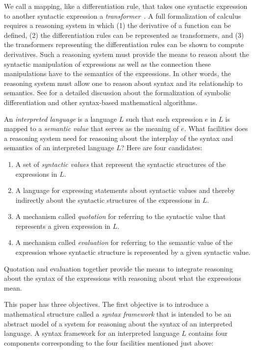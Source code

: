 \documentclass[11pt,fleqn]{article}
\newcommand{\be}{\begin{enumerate}}
\newcommand{\ee}{\end{enumerate}}
\newcommand{\bsp}{\begin{sloppypar}}
\newcommand{\esp}{\end{sloppypar}}
\begin{document}
We call a mapping, like a differentiation rule, that takes one
syntactic expression to another syntactic expression a
\emph{transformer}~\cite{FarmerMohrenschildt03}.  A full formalization
of calculus requires a reasoning system in which (1) the derivative of
a function can be defined, (2) the differentiation rules can be
represented as transformers, and (3) the transformers representing the
differentiation rules can be shown to compute derivatives.  Such a
reasoning system must provide the means to reason about the syntactic
manipulation of expressions as well as the connection these
manipulations have to the semantics of the expressions.  In other
words, the reasoning system must allow one to reason about syntax and
its relationship to semantics.  See \cite{Farmer13} for a detailed
discussion about the formalization of symbolic differentiation and
other syntax-based mathematical algorithms.

An \emph{interpreted language} is a language $L$ such that each
expression $e$ in $L$ is mapped to a \emph{semantic value} that serves
as the meaning of $e$.  What facilities does a reasoning system need
for reasoning about the interplay of the syntax and semantics of an
interpreted language $L$?  Here are four candidates:

\be

  \item A set of \emph{syntactic values} that represent the syntactic
    structures of the expressions in $L$.

  \item \bsp A language for expressing statements about syntactic
    values and thereby indirectly about the syntactic structures of
    the expressions in $L$.\esp

  \item A mechanism called \emph{quotation} for referring to the
    syntactic value that represents a given expression in $L$.

  \item A mechanism called \emph{evaluation} for referring to the
    semantic value of the expression whose syntactic structure is
    represented by a given syntactic value.

\ee 
Quotation and evaluation together provide the means to integrate
reasoning about the syntax of the expressions with reasoning about
what the expressions mean.

This paper has three objectives.  The first objective is to introduce a
mathematical structure called a \emph{syntax framework} that is
intended to be an abstract model of a system for reasoning about the
syntax of an interpreted language.  A syntax framework for an
interpreted language $L$ contains four components corresponding to the
four facilities mentioned just above:
\end{document}
